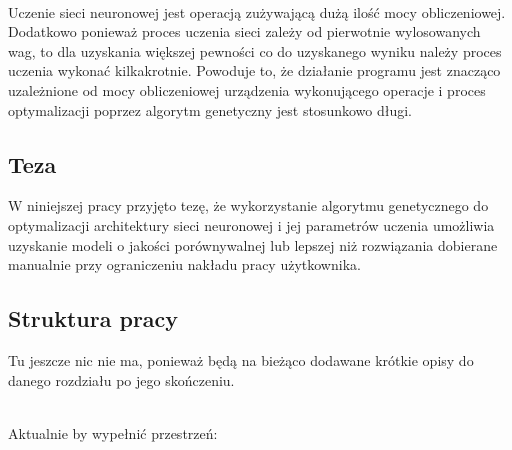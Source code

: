 \noindent\\
Uczenie sieci neuronowej jest operacją zużywającą
dużą ilość mocy obliczeniowej.
Dodatkowo ponie\-waż proces uczenia sieci zależy
od pierwotnie wylosowanych wag, to dla uzyskania większej pewności
co do uzyskanego wyniku należy proces uczenia wykonać kilkakrotnie.
Powoduje to, że działanie programu jest znacząco uzależnione
od mocy obliczeniowej urządzenia wykonującego operacje
i proces optymalizacji poprzez algorytm genetyczny
jest stosunkowo długi.

\subsection*{Teza}
W niniejszej pracy przyjęto tezę,
że wykorzystanie algorytmu genetycznego
do optymalizacji architektury sieci neuronowej
i jej parametrów uczenia umożliwia uzyskanie modeli
o jakości porównywalnej lub lepszej niż rozwiązania dobierane manualnie
przy ograniczeniu nakładu pracy użytkownika.

\subsection*{Struktura pracy}
Tu jeszcze nic nie ma,
ponieważ będą na bieżąco dodawane krótkie opisy do danego
rozdziału po jego skończeniu.

\noindent\\
Aktualnie by wypełnić przestrzeń:\\
\lipsum[1][1-10]
